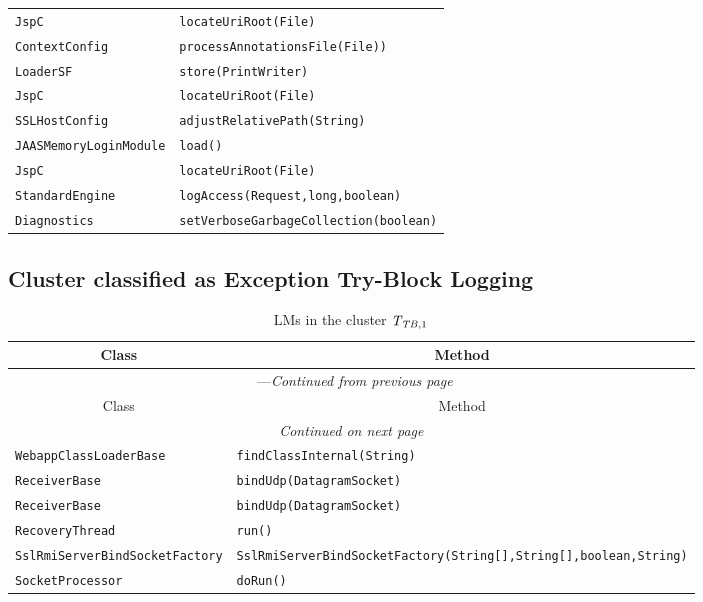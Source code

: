 \begin{center}
\begin{longtable}{ll}
\lstinline/JspC/&{\lstinline/locateUriRoot(File)/}\\
\lstinline/ContextConfig/&{\lstinline/processAnnotationsFile(File))/}\\
\lstinline/LoaderSF/&{\lstinline/store(PrintWriter)/}\\
\lstinline/JspC/&{\lstinline/locateUriRoot(File)/}\\
\lstinline/SSLHostConfig/&{\lstinline/adjustRelativePath(String)/}\\
\lstinline/JAASMemoryLoginModule/&{\lstinline/load()/}\\
\lstinline/JspC/&{\lstinline/locateUriRoot(File)/}\\
\lstinline/StandardEngine/&{\lstinline/logAccess(Request,long,boolean)/}\\
\lstinline/Diagnostics/&{\lstinline/setVerboseGarbageCollection(boolean)/}\\
\end{longtable}
\end{center}

\subsection{Cluster classified as Exception Try-Block Logging}

\begin{center}
\begin{longtable}{ll}
\caption{LMs in the cluster $\mathit{T}_{\mathit{TB},1}$}\\
\toprule\multicolumn{1}{c}{Class}&\multicolumn{1}{c}{Method}\\\midrule
\endfirsthead

\multicolumn{2}{c}{\tablename\ \thetable{}---\textit{Continued from previous page}} \\\midrule
\multicolumn{1}{c}{Class}&\multicolumn{1}{c}{Method}\\\midrule
\endhead
\multicolumn{2}{c}{\textit{Continued on next page}}\\\midrule
\endfoot
\bottomrule
\endlastfoot

\lstinline/WebappClassLoaderBase/&{\lstinline/findClassInternal(String)/}\\
\lstinline/ReceiverBase/&{\lstinline/bindUdp(DatagramSocket)/}\\
\lstinline/ReceiverBase/&{\lstinline/bindUdp(DatagramSocket)/}\\
\lstinline/RecoveryThread/&{\lstinline/run()/}\\
\lstinline/SslRmiServerBindSocketFactory/&{\lstinline/SslRmiServerBindSocketFactory(String[],String[],boolean,String)/}\\
\lstinline/SocketProcessor/&{\lstinline/doRun()/}\\
\end{longtable}
\end{center}

